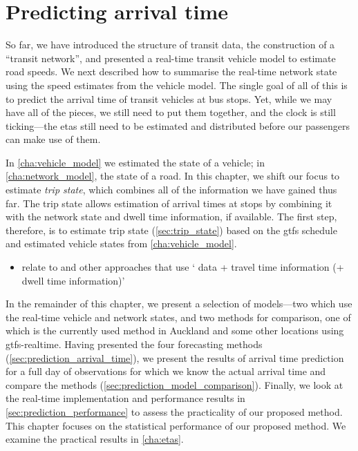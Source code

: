 \chapter{Predicting arrival time}
\label{cha:prediction}


So far, we have introduced the structure of transit data, the construction of a ``transit network'', and presented a real-time transit vehicle model to estimate road speeds. We next described how to summarise the real-time network state using the speed estimates from the vehicle model. The single goal of all of this is to predict the arrival time of transit vehicles at bus stops. Yet, while we may have all of the pieces, we still need to put them together, and the clock is still ticking---the \glspl{eta} still need to be estimated and distributed before our passengers can make use of them.

In \cref{cha:vehicle_model} we estimated the state of a vehicle; in \cref{cha:network_model}, the state of a road. In this chapter, we shift our focus to estimate \emph{trip state}, which combines all of the information we have gained thus far. The trip state allows estimation of arrival times at stops by combining it with the network state and dwell time information, if available. The first step, therefore, is to estimate trip state (\cref{sec:trip_state}) based on the \gls{gtfs} schedule and estimated vehicle states from \cref{cha:vehicle_model}.

\begin{itemize}
\item relate to \citet{Cathey_2003} and other approaches that use `\rt{} data + travel time information (+ dwell time information)'
\end{itemize}

In the remainder of this chapter, we present a selection of models---two which use the real-time vehicle and network states, and two methods for comparison, one of which is the currently used method in Auckland and some other locations using \gls{gtfs}-realtime. Having presented the four forecasting methods (\cref{sec:prediction_arrival_time}), we present the results of arrival time prediction for a full day of observations for which we know the actual arrival time and compare the methods (\cref{sec:prediction_model_comparison}). Finally, we look at the real-time implementation and performance results in \cref{sec:prediction_performance} to assess the practicality of our proposed method.
This chapter focuses on the statistical performance of our proposed method. We examine the practical results in \cref{cha:etas}.






